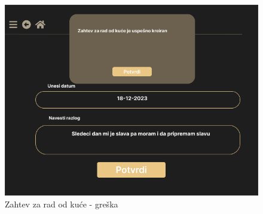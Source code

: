 \documentclass[a4paper]{article}
\begin{document}
\begin{figure} [!ht]
    \begin{center}
        \includegraphics[scale=0.25]{UI/Zaposleni/ZahtevRadOdKuceSuccess.png}
    \end{center}
\caption{Zahtev za rad od kuće - greška}
\end{figure}
\end{document}
